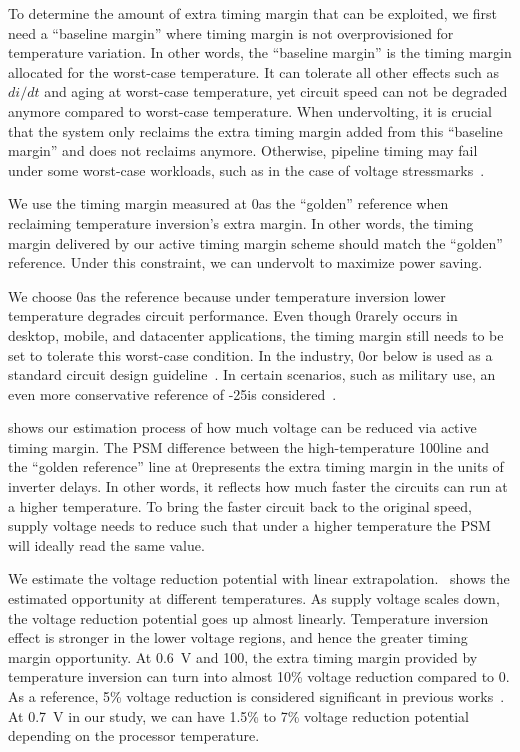To determine the amount of extra timing margin that can be exploited, we first need a ``baseline margin'' where timing margin is not overprovisioned for temperature variation. In other words, the ``baseline margin'' is the timing margin allocated for the worst-case temperature. It can tolerate all other effects such as $di/dt$ and aging at worst-case temperature, yet circuit speed can not be degraded anymore compared to worst-case temperature. When undervolting, it is crucial that the system only reclaims the extra timing margin added from this ``baseline margin'' and does not reclaims anymore. Otherwise, pipeline timing may fail under some worst-case workloads, such as in the case of voltage stressmarks~\cite{kim2012audit,bertran2014voltage}. 

We use the timing margin measured at 0\C as the ``golden'' reference when reclaiming temperature inversion's extra margin. In other words, the timing margin delivered by our active timing margin scheme should match the ``golden'' reference. Under this constraint, we can undervolt to maximize power saving. 

We choose 0\C as the reference because under temperature inversion lower temperature degrades circuit performance. Even though 0\C rarely occurs in desktop, mobile, and datacenter applications, the timing margin still needs to be set to tolerate this worst-case condition. In the industry, 0\C or below is used as a standard circuit design guideline~\cite{altera2010timing}. In certain scenarios, such as military use, an even more conservative reference of -25\C is considered~\cite{dasdan2006handling}.

 shows our estimation process of how much voltage can be reduced via active timing margin. The PSM difference between the high-temperature 100\C line and the ``golden reference'' line at 0\C represents the extra timing margin in the units of inverter delays. In other words, it reflects how much faster the circuits can run at a higher temperature. To bring the faster circuit back to the original speed, supply voltage needs to reduce such that under a higher temperature the PSM will ideally read the same value.

We estimate the voltage reduction potential with linear extrapolation.~ shows the estimated opportunity at different temperatures. As supply voltage scales down, the voltage reduction potential goes up almost linearly. Temperature inversion effect is stronger in the lower voltage regions, and hence the greater timing margin opportunity. At 0.6~V and 100\C, the extra timing margin provided by temperature inversion can turn into almost 10\% voltage reduction compared to 0\C. As a reference, 5\% voltage reduction is considered significant in previous works~\cite{webel2015robust}. At 0.7~V in our study, we can have 1.5\% to 7\% voltage reduction potential depending on the processor temperature.


